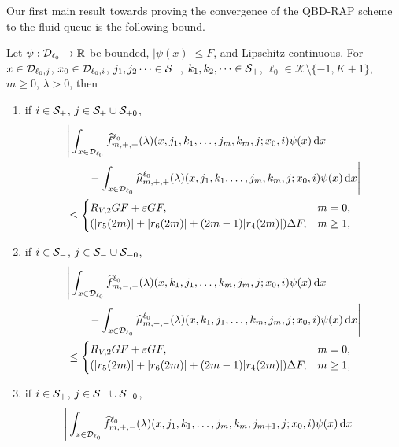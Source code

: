 Our first main result towards proving the convergence of the QBD-RAP scheme to the fluid queue is the following bound. 
\begin{cor}\label{cor: lst diff}Let \(\psi:\mathcal{D}_{\ell_0}\to\mathbb R\) be bounded, \(|\psi(x)|\leq F\), and Lipschitz continuous. For \(x\in\mathcal{D}_{\ell_0,j}\), \(x_0\in\mathcal{D}_{\ell_0,i}\), \(j_1,j_2\dots\in\mathcal{S}_-\), \(k_1,k_2,\dots\in\mathcal{S}_+\), \(\ell_0\in\mathcal K\setminus\{-1,K+1\}\), \(m\geq 0\), \(\lambda > 0\), then 
\begin{enumerate}
	\item if \(i\in\mathcal{S}_{+}\), \(j\in\mathcal{S}_+\cup\mathcal{S}_{+0}\),
	\begin{align}
                	&\Bigg|\int_{x\in\mathcal{D}_{\ell_0}}\widehat f^{\ell_0}_{m,+,+}(\lambda)(x,j_1,k_1,\dots,j_m,k_m,j; x_0,i)\psi(x) \, \mathrm{d} x \nonumber 
	\\&\qquad{} - \int_{x\in\mathcal{D}_{\ell_0}}\widehat \mu^{\ell_0}_{m,+,+}(\lambda)(x,j_1,k_1,\dots,j_m,k_m,j; x_0,i)\psi(x)\, \mathrm{d} x\Bigg| \nonumber
                	\\&\leq \begin{cases}
			R_{V,2} GF + \varepsilon GF, & m = 0, \\
			(|r_5(2m)| + |r_6(2m)| + (2m-1)|r_4(2m)|)\Delta F,  &  m\geq 1,
			\end{cases}\label{eqn: ++}
	\end{align}
	\item if \(i\in\mathcal{S}_{-}\), \(j\in\mathcal{S}_-\cup\mathcal{S}_{-0}\),
	\begin{align}
                	&\Bigg|\int_{x\in\mathcal{D}_{\ell_0}}\widehat f^{\ell_0}_{m,-,-}(\lambda)(x,k_1,j_1,\dots,k_m,j_m,j; x_0,i)\psi(x)\, \mathrm{d} x \nonumber
	\\&\qquad{} - \int_{x\in\mathcal{D}_{\ell_0}} \widehat \mu^{\ell_0}_{m,-,-}(\lambda)(x,k_1,j_1,\dots,k_m,j_m,j; x_0,i)\psi(x)\, \mathrm{d} x\Bigg| \nonumber
                	\\&\leq \begin{cases}
			R_{V,2} GF + \varepsilon GF, & m = 0, \\
			(|r_5(2m)| + |r_6(2m)| + (2m-1)|r_4(2m)|)\Delta F,  &  m\geq 1,
			\end{cases}\label{eqn: --}
	\end{align}
	\item if \(i\in\mathcal{S}_{+}\), \(j\in\mathcal{S}_-\cup\mathcal{S}_{-0}\),
	\begin{align}
                	&\Bigg|\int_{x\in\calD_{\ell_0}}\widehat f^{\ell_0}_{m,+,-}(\lambda)(x,j_1,k_1,\dots,j_m,k_m,j_{m+1},j; x_0,i)\psi(x)\wrt x \nonumber

\end{align}
\end{enumerate}
\end{cor}
